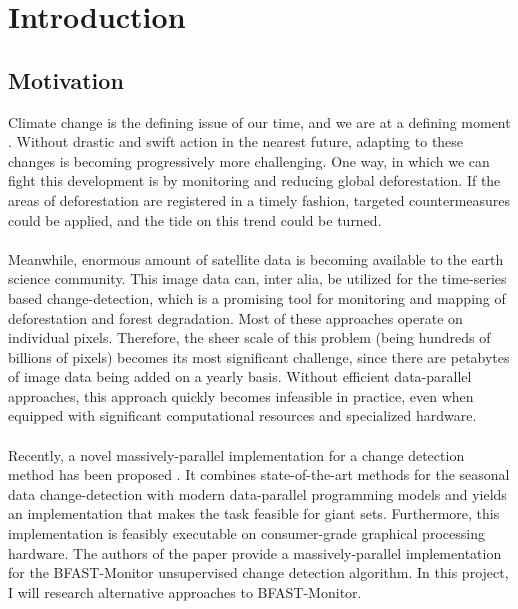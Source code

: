 \documentclass[main.tex]{subfiles}
\begin{document}
\chapter{Introduction}
\label{chap:intro}
\section{Motivation}
\label{sec:motivation}
Climate change is the defining issue of our time, and we are at a defining
moment \cite{un}. Without drastic and swift action in the nearest future, adapting to
these changes is becoming progressively more challenging. One way, in which we
can fight this development is by monitoring and reducing global deforestation.
If the areas of deforestation are registered in a timely fashion, targeted
countermeasures could be applied, and the tide on this trend could be turned. \\\\
Meanwhile, enormous amount of satellite data is becoming available to the earth
science community. This image data can, inter alia, be utilized for the
time-series based change-detection, which is a promising tool for monitoring and
mapping of deforestation and forest degradation. Most of these approaches
operate on individual pixels. Therefore, the sheer scale of this problem (being
hundreds of billions of pixels) becomes its most significant challenge, since
there are petabytes of image data being added on a yearly basis. Without
efficient data-parallel approaches, this approach quickly becomes infeasible in
practice, even when equipped with significant computational resources and
specialized hardware. \\\\
Recently, a novel massively-parallel implementation for a
change detection method has been proposed \cite{bfast_monitor}. It combines state-of-the-art methods
for the seasonal data change-detection with modern data-parallel programming
models and yields an implementation that makes the task feasible for giant sets.
Furthermore, this implementation is feasibly executable on consumer-grade
graphical processing hardware. The authors of the paper provide a
massively-parallel implementation for the BFAST-Monitor unsupervised change
detection algorithm. 
In this project, I will research alternative approaches to
BFAST-Monitor.
\end{document}
